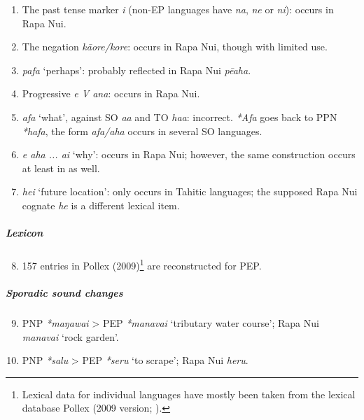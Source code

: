 \settowidth{}
\begin{enumerate}
\item 
The past tense marker \textit{i} (non-EP languages have \textit{na}, \textit{ne} or \textit{ni}): occurs in Rapa Nui.  

\item 
The negation \textit{k}\textit{āore/}\textit{kore}: occurs in Rapa Nui, though with limited use.   

\item 
\textit{pafa} ‘perhaps’: probably reflected in Rapa Nui \textit{pēaha}.   

\item 
Progressive \textit{e V {\ꞌ}ana}: occurs in Rapa Nui.   

\item 
{}\textit{afa} ‘what’, against SO \textit{aa} and TO \textit{haa}: incorrect. \textit{*Afa} goes back to PPN \textit{*hafa}, the form \textit{afa/aha} occurs in several SO languages.   

\item 
\textit{e aha ... ai} ‘why’: occurs in Rapa Nui; however, the same construction occurs at least in  as well.   

\item 
\textit{hei} ‘future location’: only occurs in Tahitic languages; the supposed Rapa Nui cognate \textit{he} is a different lexical item.   

\end{enumerate}

\subparagraph{Lexicon}

\begin{enumerate}
\setcounter{enumi}{7}
\item 
157 entries in Pollex (2009)\footnote{\label{fn:16}Lexical data for individual languages have mostly been taken from the lexical database Pollex (2009 version; \citealt{GreenhillClark2011}).} are reconstructed for PEP.

\end{enumerate}

\subparagraph{Sporadic sound changes} \citep[131]{Marck2000}

\begin{enumerate}
\setcounter{enumi}{8}
\item 
PNP \textit{*maŋawai} {\textgreater} PEP \textit{*manavai} ‘tributary water course’; Rapa Nui \textit{manavai} ‘rock garden’.   

\item 
PNP \textit{*salu} {\textgreater} PEP \textit{*seru} ‘to scrape’; Rapa Nui \textit{heru}.   

\end{enumerate}

